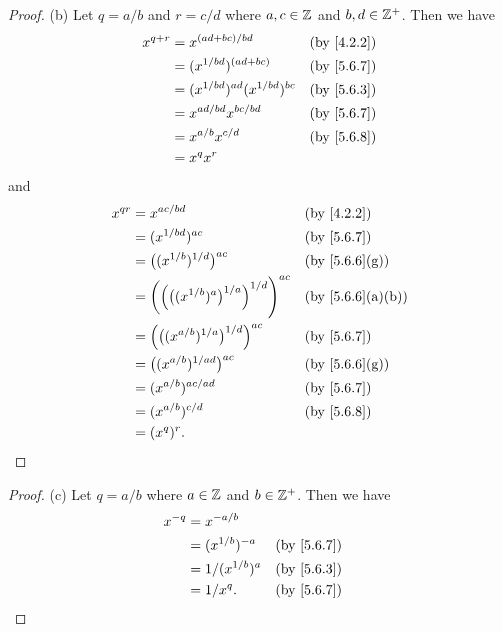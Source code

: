 \begin{proof}{(b)}
  Let \(q = a / b\) and \(r = c / d\) where \(a, c \in \mathbb{Z}\) and \(b, d \in \mathbb{Z}^+\).
  Then we have
  \begin{align*}
    x^{q + r} & = x^{(ad + bc) / bd}                  &  & \text{(by \cref{4.2.2})}  \\
              & = (x^{1 / bd})^{(ad + bc)}            &  & \text{(by \cref{5.6.7})}  \\
              & = (x^{1 / bd})^{ad} (x^{1 / bd})^{bc} &  & \text{(by \cref{5.6.3})}  \\
              & = x^{ad / bd} x^{bc / bd}             &  & \text{(by  \cref{5.6.7})} \\
              & = x^{a / b} x^{c / d}                 &  & \text{(by \cref{5.6.8})}  \\
              & = x^q x^r
  \end{align*}
  and
  \begin{align*}
    x^{qr} & = x^{ac / bd}                                                        &  & \text{(by \cref{4.2.2})}       \\
           & = (x^{1 / bd})^{ac}                                                  &  & \text{(by \cref{5.6.7})}       \\
           & = \big((x^{1 / b})^{1 / d}\big)^{ac}                                 &  & \text{(by \cref{5.6.6}(g))}    \\
           & = \bigg(\Big(\big((x^{1 / b})^a\big)^{1 / a}\Big)^{1 / d}\Bigg)^{ac} &  & \text{(by \cref{5.6.6}(a)(b))} \\
           & = \Big(\big((x^{a / b})^{1 / a}\big)^{1 / d}\Big)^{ac}               &  & \text{(by \cref{5.6.7})}       \\
           & = \big((x^{a / b})^{1 / ad}\big)^{ac}                                &  & \text{(by \cref{5.6.6}(g))}    \\
           & = (x^{a / b})^{ac / ad}                                              &  & \text{(by \cref{5.6.7})}       \\
           & = (x^{a / b})^{c / d}                                                &  & \text{(by \cref{5.6.8})}       \\
           & = (x^q)^r.
  \end{align*}
\end{proof}

\begin{proof}{(c)}
  Let \(q = a / b\) where \(a \in \mathbb{Z}\) and \(b \in \mathbb{Z}^+\).
  Then we have
  \begin{align*}
    x^{-q} & = x^{-a / b}                                      \\
           & = (x^{1 / b})^{-a}  &  & \text{(by \cref{5.6.7})} \\
           & = 1 / (x^{1 / b})^a &  & \text{(by \cref{5.6.3})} \\
           & = 1 / x^q.          &  & \text{(by \cref{5.6.7})}
  \end{align*}
\end{proof}


